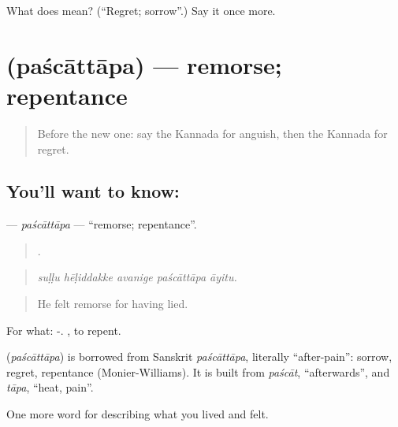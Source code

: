 \begin{tcolorbox}[breakable,colback=teal!4,colframe=teal!35!black,title={Before you move on}]
What does  mean? (\textquotedblleft{}Regret; sorrow\textquotedblright{}.) Say it once more.
\end{tcolorbox}
\section[\texorpdfstring{\kn{ಪಶ್ಚಾತ್ತಾಪ} (paścāttāpa)}{ಪಶ್ಚಾತ್ತಾಪ (paścāttāpa)}]{ (paścāttāpa) — remorse; repentance}

\label{lesson:KA-C491-pascattapa}



\begin{quote}
Before the new one: say the Kannada for anguish, then the Kannada for regret.
\end{quote}

\subsection*{You'll want to know: }
\textbf{} — \emph{paścāttāpa} — \textquotedblleft{}remorse; repentance\textquotedblright{}.

\begin{quote}
    .
\end{quote}

\begin{quote}
\emph{suḷḷu hēḷiddakke avanige paścāttāpa āyitu.}
\end{quote}

\begin{quote}
He felt remorse for having lied.
\end{quote}

For what: -.  , to repent.

\begin{cousinweb}
\textbf{} (\emph{paścāttāpa}) is borrowed from Sanskrit \emph{paścāttāpa}, literally \textquotedblleft{}after-pain\textquotedblright{}: sorrow, regret, repentance (Monier-Williams). It is built from \emph{paścāt}, \textquotedblleft{}afterwards\textquotedblright{}, and \emph{tāpa}, \textquotedblleft{}heat, pain\textquotedblright{}.
\end{cousinweb}

\begin{grammarlens}[title={What you've built}]
One more word for describing what you lived and felt.
\end{grammarlens}

